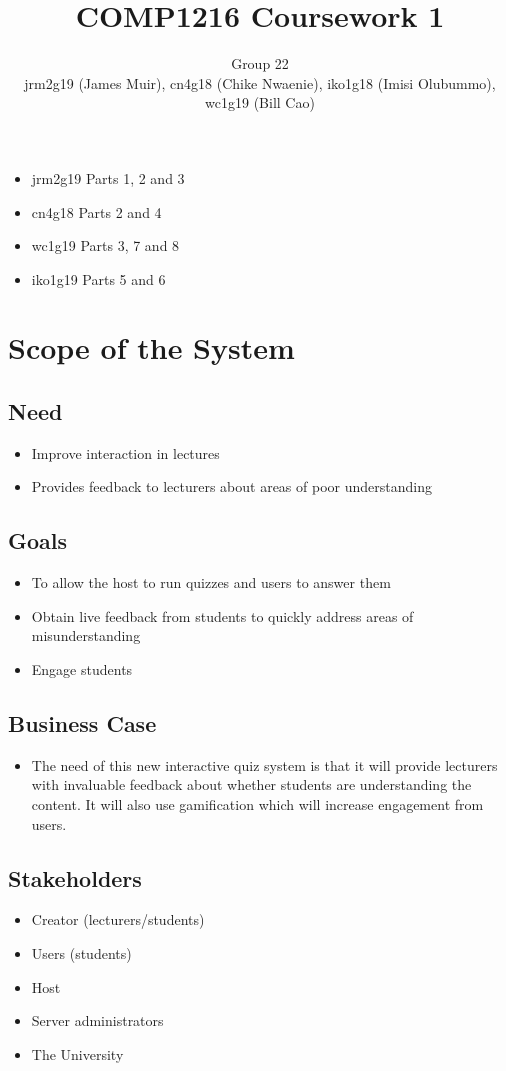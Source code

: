 \documentclass[a4paper]{article}
\title{COMP1216 Coursework 1}
\author{Group 22\\ jrm2g19 (James Muir), cn4g18 (Chike Nwaenie), iko1g18 (Imisi Olubummo), wc1g19 (Bill Cao)}
\begin{document}
	\maketitle
	\begin{center}
	\begin{itemize}
		\item jrm2g19 Parts 1, 2 and 3
		\item cn4g18 Parts 2 and 4
		\item wc1g19 Parts 3, 7 and 8
		\item iko1g19 Parts 5 and 6
	\end{itemize}
	\end{center}
	\newpage
	\section{Scope of the System}
	\subsection{Need}
	\begin{itemize}
		\item Improve interaction in lectures
		\item Provides feedback to lecturers about areas of poor understanding
	\end{itemize}	
	\subsection{Goals}
	\begin{itemize}
		\item To allow the host to run quizzes and users to answer them
		\item Obtain live feedback from students to quickly address areas of misunderstanding
		\item Engage students
	\end{itemize}
	\subsection{Business Case}
	\begin{itemize}
		\item The need of this new interactive quiz system is that it will provide lecturers
with invaluable feedback about whether students are understanding the content. It will also 
use gamification which will increase engagement from users.
	\end{itemize}
	\subsection{Stakeholders}
	\begin{itemize}
		\item Creator (lecturers/students)
		\item Users (students)
		\item Host
		\item Server administrators
		\item The University
	\end{itemize}	
\end{document}

